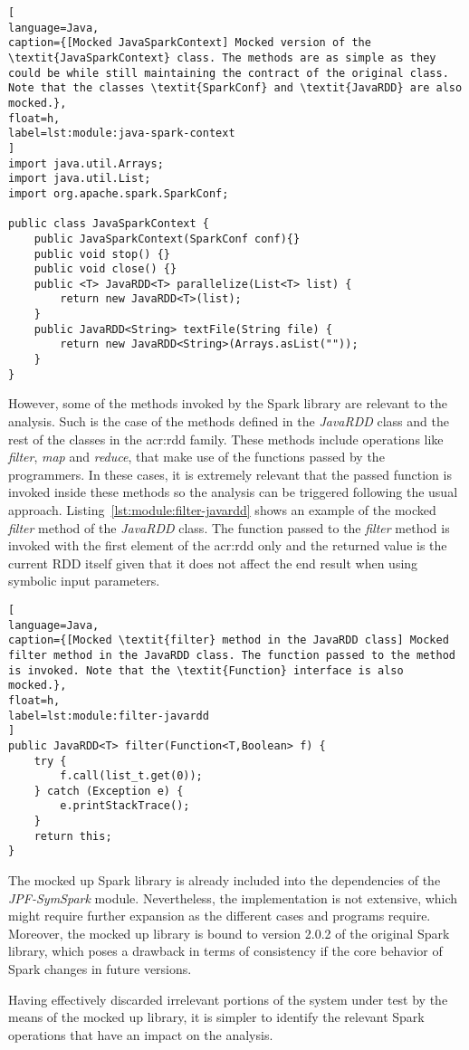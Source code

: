\begin{lstlisting}[
language=Java,
caption={[Mocked JavaSparkContext] Mocked version of the \textit{JavaSparkContext} class. The methods are as simple as they could be while still maintaining the contract of the original class. Note that the classes \textit{SparkConf} and \textit{JavaRDD} are also mocked.},
float=h,
label=lst:module:java-spark-context
]
import java.util.Arrays;
import java.util.List;
import org.apache.spark.SparkConf;

public class JavaSparkContext {	
	public JavaSparkContext(SparkConf conf){}
	public void stop() {}	
	public void close() {}
	public <T> JavaRDD<T> parallelize(List<T> list) {		
		return new JavaRDD<T>(list);
	}
	public JavaRDD<String> textFile(String file) {
		return new JavaRDD<String>(Arrays.asList(""));
	}
}
\end{lstlisting}

However, some of the methods invoked by the Spark library are relevant to the analysis. Such is the case of the methods defined in the \textit{JavaRDD} class and the rest of the classes in the \acrshort{acr:rdd} family. These methods include operations like \textit{filter}, \textit{map} and \textit{reduce}, that make use of the functions passed by the programmers. In these cases, it is extremely relevant that the passed function is invoked inside these methods so the analysis can be triggered following the usual \spf{} approach. Listing~\ref{lst:module:filter-javardd} shows an example of the mocked \textit{filter} method of the \textit{JavaRDD} class. The function passed to the \textit{filter} method is invoked with the first element of the \acrshort{acr:rdd} only and the returned value is the current RDD itself given that it does not affect the end result when using symbolic input parameters.

\begin{lstlisting}[
language=Java,
caption={[Mocked \textit{filter} method in the JavaRDD class] Mocked filter method in the JavaRDD class. The function passed to the method is invoked. Note that the \textit{Function} interface is also mocked.},
float=h,
label=lst:module:filter-javardd
]
public JavaRDD<T> filter(Function<T,Boolean> f) {		
	try {
		f.call(list_t.get(0));
	} catch (Exception e) {
		e.printStackTrace();
	}
	return this;
}
\end{lstlisting}

The mocked up Spark library is already included into the dependencies of the \textit{JPF-SymSpark} module. Nevertheless, the implementation is not extensive, which might require further expansion as the different cases and programs require. Moreover, the mocked up library is bound to version 2.0.2 of the original Spark library, which poses a drawback in terms of consistency if the core behavior of Spark changes in future versions.


Having effectively discarded irrelevant portions of the system under test by the means of the mocked up library, it is simpler to identify the relevant Spark operations that have an impact on the analysis.